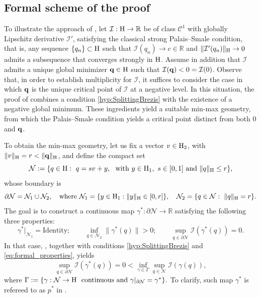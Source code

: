 \documentclass{article}
\newcommand{\boC}{\mathcal{C}}
\newcommand{\boI}{\mathcal{I}}
\newcommand{\R}{\mathbb{R}}
\newcommand{\boN}{\mathcal{N}}
\newcommand{\Hilb}{{\textnormal H}}
\newcommand{\minq}{{\bf q}}
\theoremstyle{definition}
\begin{document}
\subsection{Formal scheme of the proof}\label{Sect:Scheme}

To illustrate the approach of \cite[Theorem 4]{Bre-Nir}, let $\boI:\Hilb\to \R$ be of class $\boC^1$ with globally Lipschitz derivative $\boI'$, satisfying the classical strong Palais--Smale condition, that is, any sequence $\{q_n\}\subset \Hilb$ such that $\boI(q_n)\to c\in\R$ and $\|\boI'(q_n)\|_\Hilb\to 0$ admits a subsequence that converges strongly in $\Hilb$. Assume in addition that $\boI$ admits a unique global minimizer $\minq\in\Hilb$ such that $\boI(\minq)<0=\boI(0)$. Observe that, in order to establish multiplicity for $\boI$, it suffices to consider the case in which $\minq$ is the unique critical point of $\boI$ at a negative level. In this situation, the proof of \cite[Theorem 4]{Bre-Nir} combines a condition \eqref{hyp:SplittingBrezis} with the existence of a negative global minimum. These ingredients yield a  suitable min-max geometry, from which the Palais--Smale condition yields a critical point distinct from both $0$ and $\minq$.

To obtain the min-max geometry, let us fix a vector $v\in \Hilb_2$, with $\|v\|_\Hilb=r<\|\minq\|_\Hilb$, and define the compact set
\begin{equation}\label{def:Set-N}
\boN:=\{q\in\Hilb:\ q=sv+y,\ \hbox{ with }y\in\Hilb_1,\ s\in[0,1]\ \hbox{and } \|q\|_\Hilb\leq r\},
\end{equation}
whose boundary is
\begin{equation}\label{def:BoundarySet-N}
\partial\boN=\boN_1\cup\boN_2,\quad\text{where }\boN_1=\{y\in\Hilb_1:\|y\|_\Hilb\in[0,r]\},\quad\boN_2=\{q\in\boN:\ \|q\|_\Hilb= r\}.
\end{equation}
The goal is to construct a continuous map $\gamma^*:\partial\boN\to\R$  satisfying the following three properties:
\begin{equation}\label{eq:formal_properties}
     \gamma^*|_{\boN_1}=\text{Identity};
    \qquad  \inf_{q\in\boN_2}\|\gamma^*(q)\|>0;\qquad \sup_{q\in\partial\boN}\boI(\gamma^*(q))= 0.
\end{equation}
In that case, \cite[Lemma~3]{Bre-Nir}, together with conditions \eqref{hyp:SplittingBrezis} and \eqref{eq:formal_properties}, yields
\begin{equation*}
\sup_{q\in\partial\boN}\boI(\gamma^*(q))=0<\inf_{\gamma\in\Gamma}\sup_{q\in\boN}\boI(\gamma(q)),
\end{equation*}
where $
    \Gamma:=\{\gamma:\boN\to\Hilb\ \hbox{ continuous and }\gamma|_{\partial\boN}=\gamma^*\}.$  To clarify, such map $\gamma^*$ is refereed to as $p^*$ in \cite{Bre-Nir}.
    
\end{document}
